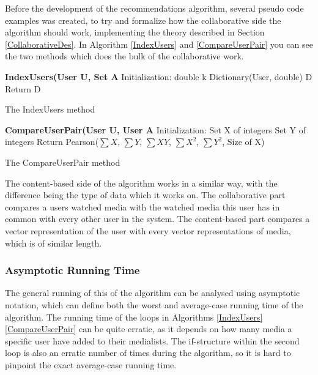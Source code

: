 Before the development of the recommendations algorithm, several pseudo code examples was created, to try and formalize how the collaborative side the algorithm should work, implementing the theory described in Section \ref{CollaborativeDes}. In Algorithm \ref{IndexUsers} and \ref{CompareUserPair} you can see the two methods which does the bulk of the collaborative work.

\begin{algorithm}[H]
	\DontPrintSemicolon
	\;
	\textbf{IndexUsers(User U, Set A}\;
	Initialization:\;
	double k\;
	Dictionary(User, double) D\;
	Return D\;
	\label{IndexUsers}
	\caption{The IndexUsers method}
\end{algorithm}


\begin{algorithm}[H]
	\DontPrintSemicolon
	\;
	\textbf{CompareUserPair(User U, User A}\;
	Initialization:\;
	Set X of integers\;
	Set Y of integers\;
	Return Pearson($\sum{X}$, $\sum{Y}$, $\sum{XY}$, $\sum{X^2}$, $\sum{Y^2}$, Size of X)
	\label{CompareUserPair}
	\caption{The CompareUserPair method}
\end{algorithm}

The content-based side of the algorithm works in a similar way, with the difference being the type of data which it works on. The collaborative part compares a users watched media with the watched media this user has in common with every other user in the system. The content-based part compares a vector representation of the user with every vector representations of media, which is of similar length.

\subsubsection{Asymptotic Running Time}

The general running of this of the algorithm can be analysed using asymptotic notation, which can define both the worst and average-case running time of the algorithm. The running time of the loops in Algorithms \ref{IndexUsers} \ref{CompareUserPair} can be quite erratic, as it depends on how many media a specific user have added to their medialists. The if-structure within the second loop is also an erratic number of times during the algorithm, so it is hard to pinpoint the exact average-case running time.

